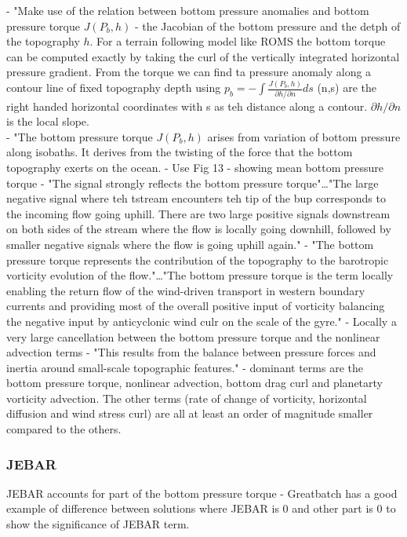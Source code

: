 \documentclass[..\EOYR.tex]{subfiles}
\begin{document}
    \citep{Gula2014} - "Make use of the relation between bottom pressure anomalies and bottom pressure torque $J(P_b,h)$ - the Jacobian of the bottom pressure and the detph of the topography $h$. For a terrain following model like ROMS  the bottom torque can be computed exactly by taking the curl of the vertically integrated horizontal pressure gradient. From the torque we can find ta pressure anomaly along a contour line of fixed topography depth using $p_b=-\int\frac{J(P_b,h)}{\partial h/\partial n}ds$ (n,s) are the right handed horizontal coordinates with s as teh distance along a contour. $\partial h/\partial n$ is the local slope.\\
    \citep{Gula2014} - "The bottom pressure torque $J(P_b,h)$ arises from variation of bottom pressure along isobaths. It derives from the twisting of the force that the bottom topography exerts on the ocean.
    \citep{Gula2014} - Use Fig 13 - showing mean bottom pressure torque - "The signal strongly reflects the bottom pressure torque"\ldots "The large negative signal where teh tstream encounters teh tip of the bup corresponds to the incoming flow going uphill. There are two large positive signals downstream on both sides of the stream where the flow is locally going downhill, followed by smaller negative signals where the flow is going uphill again."
    \citep{Gula2014} - "The bottom pressure torque represents the contribution of the topography to the barotropic vorticity evolution of the flow."\ldots "The bottom pressure torque is the term locally enabling the return flow of the wind-driven transport in western boundary currents and providing most of the overall positive input of vorticity balancing the negative input by anticyclonic wind culr on the scale of the gyre."
    \citep{Gula2014} - Locally a very large cancellation between the bottom pressure torque and the nonlinear advection terms - "This results from the balance between pressure forces and inertia around small-scale topographic features."
    \citep{Gula2014} - dominant terms are the bottom pressure torque, nonlinear advection, bottom drag curl and planetarty vorticity advection. The other terms (rate of change of vorticity, horizontal diffusion and wind stress curl) are all at least an order of magnitude smaller compared to the others.

\subsubsection*{JEBAR}
\citep{Greatbatch1991} JEBAR accounts for part of the bottom pressure torque - Greatbatch has a good example of difference between solutions where JEBAR is 0 and other part is 0 to show the significance of JEBAR term.
\end{document}
